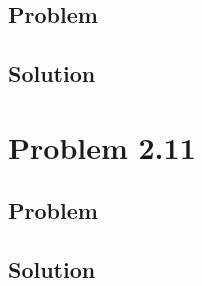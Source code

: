\documentclass[12pt]{article}
\begin{document}
\subsection{Problem}

\subsection{Solution}

\section{Problem 2.11}

\subsection{Problem}

\subsection{Solution}

\newpage



\nocite{El-Deeb_PEU-453_Assignments}
\end{document}
